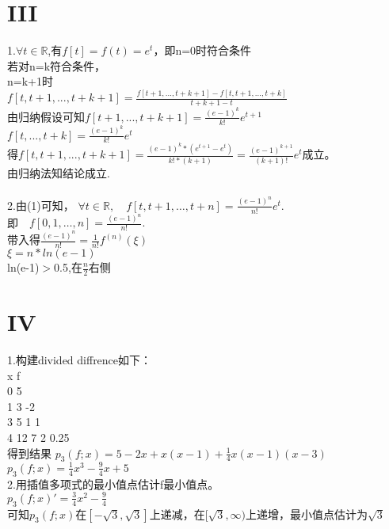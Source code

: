 \documentclass[a4paper]{article}
\begin{document}
\section*{III}

1.$\forall t \in \mathbb{R}$,有$f[t]=f(t)=e^t$，即n=0时符合条件\\
若对n=k符合条件，\\
n=k+1时\\
$f[t,t+1,...,t+k+1]=\frac{f[t+1,...,t+k+1]-f[t,t+1,...,t+k]}{t+k+1-t}$\\
由归纳假设可知$f[t+1,...,t+k+1]=\frac{(e-1)^{k}}{k!} e^{t+1}$\\
$f[t,...,t+k]=\frac{(e-1)^{k}}{k!} e^{t}$\\
得$f[t,t+1,...,t+k+1]=\frac{(e-1)^{k}*(e^{t+1}-e^t)}{k!*(k+1)}=\frac{(e-1)^{k+1}}{(k+1)!} e^{t}$成立。\\
由归纳法知结论成立.\\
\\
2.由(1)可知，
$\forall t \in \mathbb{R}, \quad f[t, t+1, \ldots, t+n] = \frac{(e-1)^{n}}{n!} e^{t}.$\\
即$\quad f[0, 1, \ldots, n] = \frac{(e-1)^{n}}{n!}.$\\
带入得$ \frac{(e-1)^{n}}{n!}=\frac{1}{n!} f^{(n)}(\xi)$\\
$\xi=n*ln(e-1)$\\
ln(e-1)$>$0.5,在$\frac{n}{2}$右侧\\



\section*{IV}
1.构建divided diffrence如下：\\
x f\\
0 5\\
1 3  -2\\
3 5  1 1\\
4 12 7 2 0.25\\
得到结果
$p_3(f;x)=5-2x+x(x-1)+\frac{1}{4}x(x-1)(x-3)$\\
$p_3(f;x)=\frac{1}{4}x^3-\frac{9}{4}x+5$\\

2.用插值多项式的最小值点估计f最小值点。\\
$p_3(f;x)'=\frac{3}{4}x^2-\frac{9}{4}$\\
可知$p_3(f;x)$在$[-\sqrt{3},\sqrt{3}]$上递减，在$[\sqrt{3},\infty)$上递增，最小值点估计为$\sqrt{3}$\\
\end{document}
